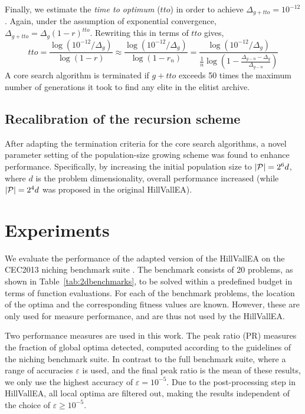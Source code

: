 \documentclass[10pt,a4paper, geometry, fullpage]{article}
\theoremstyle{plain}
\theoremstyle{remark}
\begin{document}
Finally, we estimate the \textit{time to optimum} ($tto$) in order to achieve $\Delta_{g+tto} = 10^{-12}$. Again, under the assumption of exponential convergence, $\Delta_{g+tto} = \Delta_g(1-r)^{tto}$. Rewriting this in terms of $tto$ gives,
\begin{equation}
tto = \frac{\log\left({10^ {-12}}/{\Delta_g }\right) }{\log\left(1-r\right)} \approx \frac{\log\left({10^ {-12}}/{\Delta_g }\right) }{\log\left(1-r_n\right)} = \frac{\log\left({10^ {-12}}/{\Delta_g }\right) }{\frac1n\log\left(1-\frac{\Delta_{g-n}-\Delta_g}{\Delta_{g-n}}\right)}
\end{equation}
A core search algorithm is terminated if $g + tto$ exceeds 50 times the maximum number of generations it took to find any elite in the elitist archive.

\subsection{Recalibration of the recursion scheme}
After adapting the termination criteria for the core search algorithms, a novel parameter setting of the population-size growing scheme was found to enhance performance. Specifically, by increasing the initial population size to $|\mathcal{P}| = 2^6d$, where $d$ is the problem dimensionality, overall performance increased (while $|\mathcal{P}| = 2^ 4d$ was proposed in the original HillVallEA). 

\section{Experiments}
We evaluate the performance of the adapted version of the HillVallEA on the CEC2013 niching benchmark suite \cite{CEC2013NichingCompetition}. The benchmark consists of 20 problems, as shown in Table~\ref{tab:2dbenchmarks}, to be solved within a predefined budget in terms of function evaluations. For each of the benchmark problems, the location of the optima and the corresponding fitness values are known. However, these are only used for measure performance, and are thus not used by the HillVallEA. 

Two performance measures are used in this work. The peak ratio (PR) measures the fraction of global optima detected, computed according to the guidelines of the niching benchmark suite. In contrast to the full benchmark suite, where a range of accuracies $\varepsilon$ is used, and the final peak ratio is the mean of these results, we only use the highest accuracy of $\varepsilon = 10^{-5}$. Due to the post-processing step in HillVallEA, all local optima are filtered out, making the results independent of the choice of $\varepsilon \geq 10^{-5}$.
\end{document}
